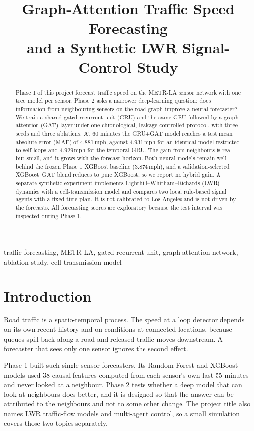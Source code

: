 \documentclass[conference]{IEEEtran}
\title{Graph-Attention Traffic Speed Forecasting\\and a Synthetic LWR Signal-Control Study}
\author{\IEEEauthorblockN{Kavya Katal, Rudraksh Sharma, Anshuman Mehta, Vridhi Chaudhary, Bineet Keshari}
\IEEEauthorblockA{Team T072, Section C, Rishihood University\\
Project 4, Phase 2 (Deep Learning) report, November 2026}}
\begin{document}
\maketitle

\begin{abstract}
Phase 1 of this project forecast traffic speed on the METR-LA sensor network with one tree model per sensor. Phase 2 asks a narrower deep-learning question: does information from neighbouring sensors on the road graph improve a neural forecaster? We train a shared gated recurrent unit (GRU) and the same GRU followed by a graph-attention (GAT) layer under one chronological, leakage-controlled protocol, with three seeds and three ablations. At 60 minutes the GRU+GAT model reaches a test mean absolute error (MAE) of 4.881\,mph, against 4.931\,mph for an identical model restricted to self-loops and 4.929\,mph for the temporal GRU. The gain from neighbours is real but small, and it grows with the forecast horizon. Both neural models remain well behind the frozen Phase 1 XGBoost baseline (3.874\,mph), and a validation-selected XGBoost--GAT blend reduces to pure XGBoost, so we report no hybrid gain. A separate synthetic experiment implements Lighthill--Whitham--Richards (LWR) dynamics with a cell-transmission model and compares two local rule-based signal agents with a fixed-time plan. It is not calibrated to Los Angeles and is not driven by the forecasts. All forecasting scores are exploratory because the test interval was inspected during Phase 1.
\end{abstract}

\begin{IEEEkeywords}
traffic forecasting, METR-LA, gated recurrent unit, graph attention network, ablation study, cell transmission model
\end{IEEEkeywords}

\section{Introduction}
Road traffic is a spatio-temporal process. The speed at a loop detector depends on its own recent history and on conditions at connected locations, because queues spill back along a road and released traffic moves downstream. A forecaster that sees only one sensor ignores the second effect.

Phase 1 built such single-sensor forecasters. Its Random Forest and XGBoost models used 38 causal features computed from each sensor's own last 55 minutes and never looked at a neighbour. Phase 2 tests whether a deep model that can look at neighbours does better, and it is designed so that the answer can be attributed to the neighbours and not to some other change. The project title also names LWR traffic-flow models and multi-agent control, so a small simulation covers those two topics separately.
\end{document}
